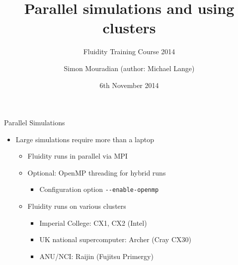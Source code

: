 \documentclass[t, hyperref={pdfpagelabels=false}]{beamer}
\title[Parallel Simulations]{Parallel simulations and using clusters}
\subtitle[]{Fluidity Training Course 2014}
\author[]{\footnotesize Simon Mouradian (author: Michael Lange)}
\institute{AMCG, Imperial College London}
\date{\footnotesize 6th November 2014}
\begin{document}
\titlepage

\begin{frame}{Parallel Simulations}
  \begin{itemize}
  \item[] Large simulations require more than a laptop
    \begin{itemize}
      \vspace{1em}
    \item Fluidity runs in parallel via MPI
    \item Optional: OpenMP threading for hybrid runs
      \begin{itemize}
      \item Configuration option \lstinline+--enable-openmp+
      \end{itemize}

      \vspace{1em}
    \item Fluidity runs on various clusters
      \begin{itemize}
      \item Imperial College: CX1, CX2 (Intel)
      \item UK national supercomputer: Archer (Cray CX30)
      \item ANU/NCI: Raijin (Fujitsu Primergy)
      \end{itemize}
    \end{itemize}
  \end{itemize}
\end{frame}
\end{document}
